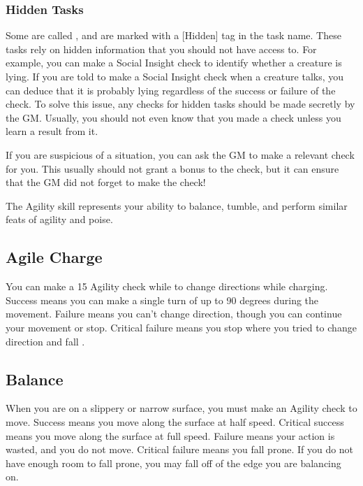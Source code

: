     \subsubsection{Hidden Tasks}\label{Hidden Tasks}
        Some  are called , and are marked with a [Hidden] tag in the task name.
        These tasks rely on hidden information that you should not have access to.
        For example, you can make a Social Insight check to identify whether a creature is lying.
        If you are told to make a Social Insight check when a creature talks, you can deduce that it is probably lying regardless of the success or failure of the check.
        To solve this issue, any checks for hidden tasks should be made secretly by the GM.\@
        Usually, you should not even know that you made a check unless you learn a result from it.

        If you are suspicious of a situation, you can ask the GM to make a relevant check for you.
        This usually should not grant a bonus to the check, but it can ensure that the GM did not forget to make the check!

\newpage
{}
        The Agility skill represents your ability to balance, tumble, and perform similar feats of agility and poise.

    \subsection{Agile Charge}\label{Agile Charge}
        You can make a  15 Agility check while  to change directions while charging.
        Success means you can make a single turn of up to 90 degrees during the movement.
        Failure means you can't change direction, though you can continue your movement or stop.
        Critical failure means you stop where you tried to change direction and fall \prone.

    \subsection{Balance}\label{Balance}

        When you are on a slippery or narrow surface, you must make an Agility check to move.
        Success means you move along the surface at half speed.
        Critical success means you move along the surface at full speed.
        Failure means your action is wasted, and you do not move.
        Critical failure means you fall prone.
        If you do not have enough room to fall prone, you may fall off of the edge you are balancing on.

